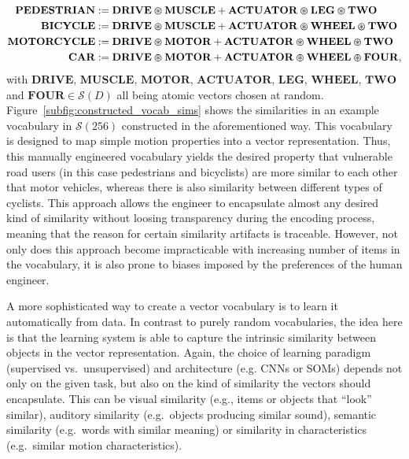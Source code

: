 \begin{align*}
\mathbf{PEDESTRIAN} &:= \mathbf{DRIVE} \varoast \mathbf{MUSCLE} + \mathbf{ACTUATOR} \varoast \mathbf{LEG} \varoast \mathbf{TWO} \\
\mathbf{BICYCLE} &:= \mathbf{DRIVE} \varoast \mathbf{MUSCLE} + \mathbf{ACTUATOR} \varoast \mathbf{WHEEL} \varoast \mathbf{TWO}\\
\mathbf{MOTORCYCLE} &:= \mathbf{DRIVE} \varoast \mathbf{MOTOR} + \mathbf{ACTUATOR} \varoast \mathbf{WHEEL} \varoast \mathbf{TWO}\\
\mathbf{CAR} &:= \mathbf{DRIVE} \varoast \mathbf{MOTOR} + \mathbf{ACTUATOR} \varoast \mathbf{WHEEL} \varoast \mathbf{FOUR},
\end{align*}
with $\mathbf{DRIVE}$, $\mathbf{MUSCLE}$, $\mathbf{MOTOR}$, $\mathbf{ACTUATOR}$, $\mathbf{LEG}$, $\mathbf{WHEEL}$, $\mathbf{TWO}$ and $\mathbf{FOUR} \in \mathcal{S}(D)$ all being atomic vectors chosen at random.
Figure~\ref{subfig:constructed_vocab_sims} shows the similarities in an example vocabulary in $\mathcal{S}(256)$ constructed in the aforementioned way.
This vocabulary is designed to map simple motion properties into a vector representation.
Thus, this manually engineered vocabulary yields the desired property that vulnerable road users (in this case pedestrians and bicyclists) are more similar to each other that motor vehicles, whereas there is also similarity between different types of cyclists.
This approach allows the engineer to encapsulate almost any desired kind of similarity without loosing transparency during the encoding process, meaning that the reason for certain similarity artifacts is traceable.
However, not only does this approach become impracticable with increasing number of items in the vocabulary, it is also prone to biases imposed by the preferences of the human engineer.

A more sophisticated way to create a vector vocabulary is to learn it automatically from data.
In contrast to purely random vocabularies, the idea here is that the learning system is able to capture the intrinsic similarity between objects in the vector representation.
Again, the choice of learning paradigm (supervised vs.\ unsupervised) and architecture (e.g. \acp{CNN} or \acp{SOM}) depends not only on the given task, but also on the kind of similarity the vectors should encapsulate.
This can be visual similarity (e.g., items or objects that \enquote{look} similar), auditory similarity (e.g.\ objects producing similar sound), semantic similarity (e.g.\ words with similar meaning) or similarity in characteristics (e.g.\ similar motion characteristics).

